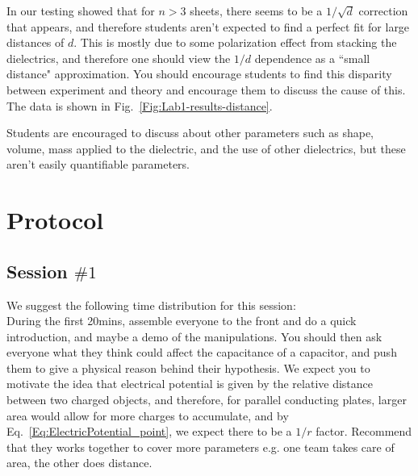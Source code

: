 \documentclass[12pt]{report}
\begin{document}
\begin{tcolorbox}
In our testing showed that for $n>3$ sheets, there seems to be a $1/\sqrt{d}$ correction that appears, and therefore students aren't expected to find a perfect fit for large distances of $d$. This is mostly due to some polarization effect from stacking the dielectrics, and therefore one should view the $1/d$ dependence as a ``small distance" approximation. You should encourage students to find this disparity between experiment and theory and encourage them to discuss the cause of this. The data is shown in Fig.~\ref{Fig:Lab1-results-distance}.
\end{tcolorbox}

\begin{tcolorbox}
Students are encouraged to discuss about other parameters such as shape, volume, mass applied to the dielectric, and the use of other dielectrics, but these aren't easily quantifiable parameters.
\end{tcolorbox}



\section{Protocol}
\subsection{Session $\# 1$}
\begin{tcolorbox}[title=Session \#1]
We suggest the following time distribution for this session:\\

During the first 20mins, assemble everyone to the front and do a quick introduction, and maybe a demo of the manipulations. You should then ask everyone what they think could affect the capacitance of a capacitor, and push them to give a physical reason behind their hypothesis. We expect you to motivate the idea that electrical potential is given by the relative distance between two charged objects, and therefore, for parallel conducting plates, larger area would allow for more charges to accumulate, and by Eq.~\ref{Eq:ElectricPotential_point}, we expect there to be a $1/r$ factor. Recommend that they works together to cover more parameters e.g. one team takes care of area, the other does distance.
\end{tcolorbox}
\end{document}

